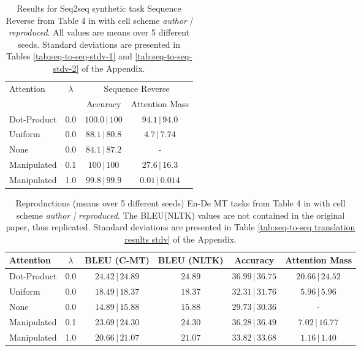 \begin{table}
\centering
\caption{Results for Seq2seq synthetic task Sequence Reverse from Table 4 in \citet{pruthi-etal-2020-learning} with cell scheme \textit{author | reproduced}. All values are means over 5 different seeds. Standard deviations are presented in Tables \ref{tab:seq-to-seq-stdv-1} and \ref{tab:seq-to-seq-stdv-2} of the Appendix.}
\label{tab:authors-seq-to-seq-results-2}
\begin{tabular}{lccc} 
\toprule
Attention   & $\lambda$ & \multicolumn{2}{c}{Sequence Reverse}            \\ 
\cline{3-4}
            &           & Accuracy                  & Attention Mass                  \\ 
\midrule
Dot-Product & 0.0       & $100.0\pmb{\,|\,}100$ & $94.1\pmb{\,|\,}94.0$   \\ 
\midrule
Uniform     & 0.0       & $88.1\pmb{\,|\,}80.8$ & $4.7\pmb{\,|\,}7.74$    \\
None        & 0.0       & $84.1\pmb{\,|\,}87.2$ & -                       \\ 
\midrule
Manipulated & 0.1       & $100\pmb{\,|\,}100$   & $27.6\pmb{\,|\,}16.3$   \\
Manipulated & 1.0       & $99.8\pmb{\,|\,}99.9$ & $0.01\pmb{\,|\,}0.014$  \\
\bottomrule
\end{tabular}
\end{table}

\begin{table}
\centering
\caption{Reproductions (means over 5 different seeds) En-De MT tasks from Table 4 in \citet{pruthi-etal-2020-learning} with cell scheme \textit{author | reproduced}. The BLEU(NLTK) values are not contained in the original paper, thus replicated. Standard deviations are presented in Table \ref{tab:seq-to-seq translation results stdv} of the Appendix.}
\label{tab:seq-to-seq translation results}
\begin{tabular}{lccccc} 
\toprule
Attention   & $\lambda$ & BLEU (C-MT)             & BLEU (NLTK) & Accuracy                & Attention Mass           \\ 
\midrule
Dot-Product & 0.0       & $24.42\pmb{\,|\,}24.89$ & $24.89$     & $36.99\pmb{\,|\,}36.75$ & $20.66\pmb{\,|\,}24.52$  \\ 
\midrule
Uniform     & 0.0       & $18.49\pmb{\,|\,}18.37$ & $18.37$     & $32.31\pmb{\,|\,}31.76$ & $5.96\pmb{\,|\,}5.96$    \\
None        & 0.0       & $14.89\pmb{\,|\,}15.88$ & $15.88$     & $29.73\pmb{\,|\,}30.36$ & -                        \\ 
\midrule
Manipulated & 0.1       & $23.69\pmb{\,|\,}24.30$ & $24.30$     & $36.28\pmb{\,|\,}36.49$ & $7.02\pmb{\,|\,}16.77$   \\
Manipulated & 1.0       & $20.66\pmb{\,|\,}21.07$ & $21.07$     & $33.82\pmb{\,|\,}33.68$ & $1.16\pmb{\,|\,}1.40$    \\
\bottomrule
\end{tabular}
\end{table}

